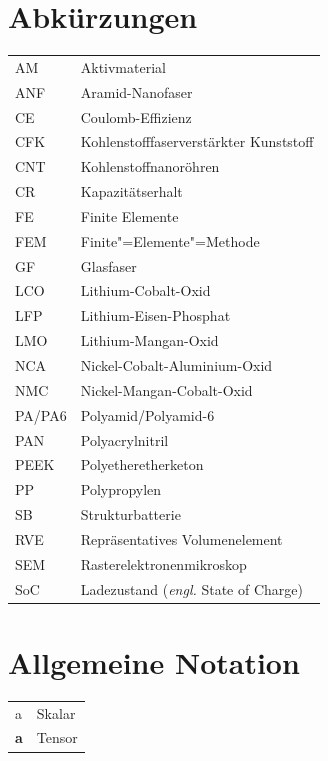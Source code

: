 {\renewcommand*{\arraystretch}{1.2}%

\section*{Abkürzungen}

\begin{longtable}{@{}p{\TabulatorVZ}@{}p{\TabulatorTX+\TabulatorEH+2\tabcolsep}@{}}
AM								& Aktivmaterial \\
ANF								& Aramid-Nanofaser \\
CE								& Coulomb-Effizienz \\
CFK								& Kohlenstofffaserverstärkter Kunststoff \\	
CNT								& Kohlenstoffnanoröhren \\
CR								& Kapazitätserhalt \\
FE								& Finite Elemente \\
FEM								& Finite"=Elemente"=Methode \\
GF								& Glasfaser \\
LCO								& Lithium-Cobalt-Oxid \\
LFP								& Lithium-Eisen-Phosphat \\
LMO								& Lithium-Mangan-Oxid \\
NCA								& Nickel-Cobalt-Aluminium-Oxid \\
NMC								& Nickel-Mangan-Cobalt-Oxid \\
PA/PA6							& Polyamid/Polyamid-6 \\
PAN								& Polyacrylnitril \\
PEEK    	        			& Polyetheretherketon \\
PP								& Polypropylen \\
SB								& Strukturbatterie \\
RVE								& Repräsentatives Volumenelement\\
SEM								& Rasterelektronenmikroskop\\
SoC								& Ladezustand (\textit{engl.} State of Charge) \\
\end{longtable}

\section*{Allgemeine Notation}

\begin{longtable}{@{}p{\TabulatorVZ}@{}p{\TabulatorTX+\TabulatorEH+2\tabcolsep}@{}}
a									& Skalar \\
\textbf{a}				& Tensor
\end{longtable}

}
